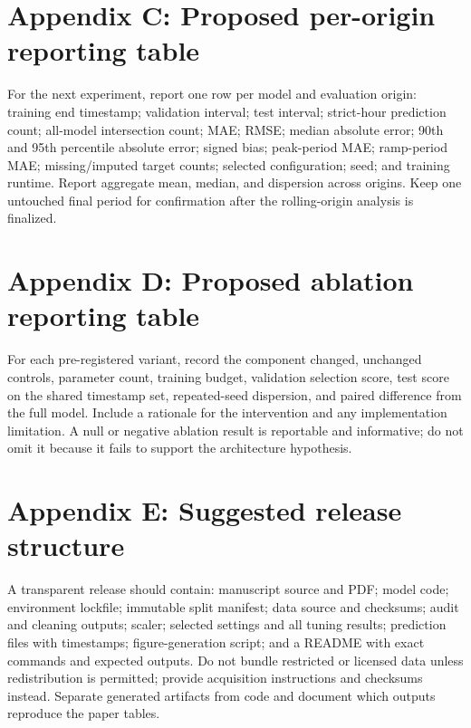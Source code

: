 \documentclass[12pt,a4paper]{article}
\begin{document}
\section{Appendix C: Proposed per-origin reporting table}
For the next experiment, report one row per model and evaluation origin: training end timestamp; validation interval; test interval; strict-hour prediction count; all-model intersection count; MAE; RMSE; median absolute error; 90th and 95th percentile absolute error; signed bias; peak-period MAE; ramp-period MAE; missing/imputed target counts; selected configuration; seed; and training runtime. Report aggregate mean, median, and dispersion across origins. Keep one untouched final period for confirmation after the rolling-origin analysis is finalized.

\section{Appendix D: Proposed ablation reporting table}
For each pre-registered variant, record the component changed, unchanged controls, parameter count, training budget, validation selection score, test score on the shared timestamp set, repeated-seed dispersion, and paired difference from the full model. Include a rationale for the intervention and any implementation limitation. A null or negative ablation result is reportable and informative; do not omit it because it fails to support the architecture hypothesis.

\section{Appendix E: Suggested release structure}
A transparent release should contain: manuscript source and PDF; model code; environment lockfile; immutable split manifest; data source and checksums; audit and cleaning outputs; scaler; selected settings and all tuning results; prediction files with timestamps; figure-generation script; and a README with exact commands and expected outputs. Do not bundle restricted or licensed data unless redistribution is permitted; provide acquisition instructions and checksums instead. Separate generated artifacts from code and document which outputs reproduce the paper tables.
\end{document}
